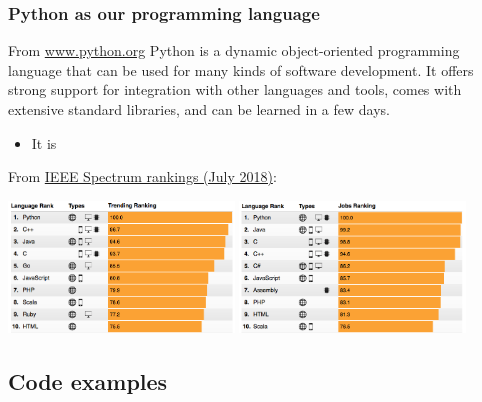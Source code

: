\documentclass[hyperref={colorlinks=true}]{beamer}
\begin{document}
\begin{frame}%
  \frametitle{Python as our programming language}
    
  \begin{ucblock}{From \url{www.python.org}}
    Python is a dynamic object-oriented programming language that can be used for many kinds of software development. It offers strong support for integration with other languages and tools, comes with extensive standard libraries, and can be learned in a few days.
  \end{ucblock}
  
  
  \begin{itemize}
    \item It is 
  \end{itemize}
    
  From \href{https://spectrum.ieee.org/static/interactive-the-top-programming-languages-2018}{IEEE Spectrum rankings (July 2018)}:

  \begin{center}
    \includegraphics[width=0.45\textwidth]{Python-Trending.png}
    \includegraphics[width=0.45\textwidth]{Python-Jobs.png}
  \end{center}  
    
\end{frame}

\subsection[Code examples]{Code examples}
\end{document}
